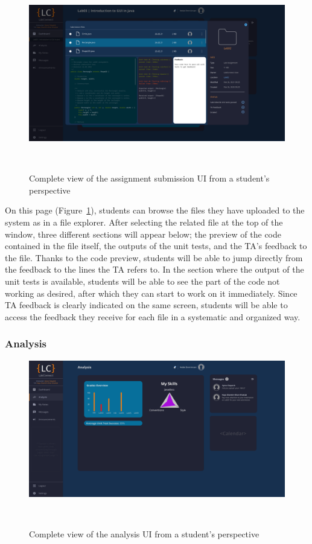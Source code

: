 \documentclass[a4paper, 12pt]{article}
\begin{document}
    \begin{figure}[H]
        \centering
        \includegraphics[width=\textwidth]{student_assignment_submission}
        \caption{Complete view of the assignment submission UI from a student's perspective}~\label{fig:student_assignment_submission_full}
    \end{figure}

    On this page (Figure~\ref{fig:student_assignment_submission_full}), students can browse the files they have uploaded to the system as in a file explorer.
    After selecting the related file at the top of the window, three different sections will appear below; the preview of the code contained in the file itself,
    the outputs of the unit tests, and the TA's feedback to the file. Thanks to the code preview, students will be able to jump directly from the feedback
    to the lines the TA refers to. In the section where the output of the unit tests is available, students will be able to see the part of the code not
    working as desired, after which they can start to work on it immediately. Since TA feedback is clearly indicated on the same screen, students will be able to access the feedback they
    receive for each file in a systematic and organized way.

    \pagebreak

    \subsubsection{Analysis}

    \begin{figure}[H]
        \centering
        \includegraphics[width=\textwidth]{student_analysis}
        \caption{Complete view of the analysis UI from a student's perspective}~\label{fig:student_analysis_full}
    \end{figure}
\end{document}
